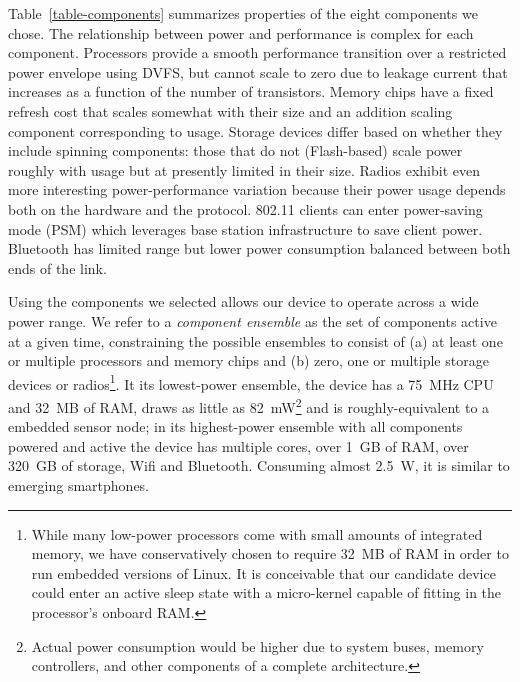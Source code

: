 Table~\ref{table-components} summarizes properties of the eight components we
chose. The relationship between power and performance is complex for each
component. Processors provide a smooth performance transition over a
restricted power envelope using DVFS, but cannot scale to zero due to leakage
current that increases as a function of the number of transistors. Memory
chips have a fixed refresh cost that scales somewhat with their size and an
addition scaling component corresponding to usage. Storage devices differ
based on whether they include spinning components: those that do not
(Flash-based) scale power roughly with usage but at presently limited in
their size. Radios exhibit even more interesting power-performance variation
because their power usage depends both on the hardware and the protocol.
802.11 clients can enter power-saving mode (PSM) which leverages base station
infrastructure to save client power. Bluetooth has limited range but lower
power consumption balanced between both ends of the link.


Using the components we selected allows our device to operate across a wide
power range. We refer to a \textit{component ensemble} as the set of
components active at a given time, constraining the possible ensembles to
consist of (a) at least one or multiple processors and memory chips and (b)
zero, one or multiple storage devices or radios\footnote{While many low-power
processors come with small amounts of integrated memory, we have
conservatively chosen to require 32~MB of RAM in order to run embedded
versions of Linux. It is conceivable that our candidate device could enter an
active sleep state with a micro-kernel capable of fitting in the processor's
onboard RAM.}. It its lowest-power ensemble, the device has a 75~MHz CPU and
32~MB of RAM, draws as little as 82~mW\footnote{Actual power consumption
would be higher due to system buses, memory controllers, and other components
of a complete architecture.} and is roughly-equivalent to a embedded sensor
node; in its highest-power ensemble with all components powered and active
the device has multiple cores, over 1~GB of RAM, over 320~GB of storage, Wifi
and Bluetooth. Consuming almost 2.5~W, it is similar to emerging smartphones.

